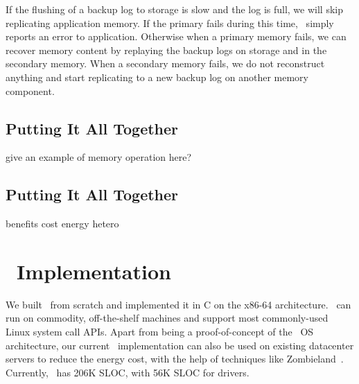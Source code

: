 \documentclass[10pt,times,twocolumn]{z2-article}
\begin{document}
{{{{{{{If the flushing of a backup log to storage is slow and the log is full, 
we will skip replicating application memory.
If the primary fails during this time, \lego\ simply reports an error to application.
Otherwise when a primary memory fails, we can recover memory content 
by replaying the backup logs on storage and in the secondary memory.
When a secondary memory fails, we do not reconstruct anything 
and start replicating to a new backup log on another memory component.




\subsection{Putting It All Together}
give an example of memory operation here?

\subsection{Putting It All Together}
benefits
cost
energy
hetero


\fi
\section{\lego\ Implementation}
\label{sec:impl}

We built \lego\ from scratch
and implemented it in C on the x86-64 architecture.
\lego\ can run on commodity, off-the-shelf machines 
and support most commonly-used Linux system call APIs.
Apart from being a proof-of-concept of the \splitkernel\ OS architecture,
our current \lego\ implementation can also be used on existing datacenter servers to reduce the energy cost,
with the help of techniques like Zombieland~\cite{Nitu18-EUROSYS}.
Currently, \lego\ has 206K SLOC,
with 56K SLOC for drivers.


}}}}}}}
\end{document}
